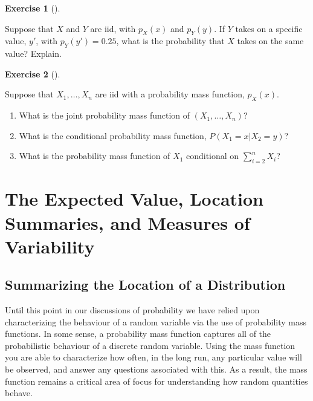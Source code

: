 \documentclass[
  letterpaper,
  DIV=11,
  numbers=noendperiod]{scrreprt}
\providecommand{\tightlist}{%
  \setlength{\itemsep}{0pt}\setlength{\parskip}{0pt}}\usepackage{longtable,booktabs,array}
\theoremstyle{definition}
\newtheorem{exercise}{Exercise}[chapter]
\theoremstyle{definition}
\theoremstyle{definition}
\theoremstyle{remark}
\begin{document}
\begin{exercise}[]\protect\hypertarget{exr-5.15}{}\label{exr-5.15}

Suppose that \(X\) and \(Y\) are iid, with \(p_X(x)\) and \(p_Y(y)\). If
\(Y\) takes on a specific value, \(y'\), with \(p_Y(y') = 0.25\), what
is the probability that \(X\) takes on the same value? Explain.

\end{exercise}

\begin{exercise}[]\protect\hypertarget{exr-5.16}{}\label{exr-5.16}

Suppose that \(X_1,\dots,X_n\) are iid with a probability mass function,
\(p_X(x)\).

\begin{enumerate}
\def\labelenumi{\alph{enumi}.}
\tightlist
\item
  What is the joint probability mass function of \((X_1,\dots,X_n)\)?
\item
  What is the conditional probability mass function,
  \(P(X_1 = x | X_2 = y)\)?
\item
  What is the probability mass function of \(X_1\) conditional on
  \(\sum_{i=2}^n X_i\)?
\end{enumerate}

\end{exercise}

\chapter{The Expected Value, Location Summaries, and Measures of
Variability}\label{the-expected-value-location-summaries-and-measures-of-variability}

\section{Summarizing the Location of a
Distribution}\label{summarizing-the-location-of-a-distribution}

Until this point in our discussions of probability we have relied upon
characterizing the behaviour of a random variable via the use of
probability mass functions. In some sense, a probability mass function
captures all of the probabilistic behaviour of a discrete random
variable. Using the mass function you are able to characterize how
often, in the long run, any particular value will be observed, and
answer any questions associated with this. As a result, the mass
function remains a critical area of focus for understanding how random
quantities behave.
\end{document}
